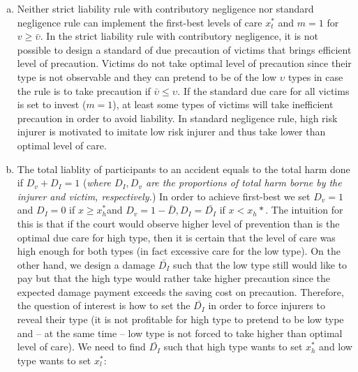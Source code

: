 \documentclass[12pt,english]{article}%
\begin{document}
\begin{enumerate}[(a)]
		\item Neither strict liability rule with contributory negligence nor standard negligence rule can implement the first-best levels of care $x_t^*$ and $m=1$ for $v\geq\bar{\upsilon}$. In the strict liability rule with contributory negligence, it is not possible to design a standard of due precaution of victims that brings efficient level of precaution. Victims do not take optimal level of precaution since their type is not observable and they can pretend to be of the low $\upsilon$ types in case the rule is to take precaution if $\bar{\upsilon}\leq\upsilon$. If the standard due care for all victims is set to invest ($m=1$), at least some types of victims will take inefficient precaution in order to avoid liability. In standard negligence rule, high risk injurer is motivated to imitate low risk injurer and thus take lower than optimal level of care. 
		\item The total liablity of participants to an accident equals to the total harm done if $D_v+D_I=1$ (\textit{where $D_I,D_v$ are the proportions of total harm borne by the injurer and victim, respectively.})	In order to achieve first-best we set $D_v=1$ and $D_I=0$ if $x\geq{x_h^*}$and $D_v=1-\bar{D},D_I=\bar{D_I}$ if $x<{x_h*}$. The intuition for this is that if the court would observe higher level of prevention than is the optimal due care for high type, then it is certain that the level of care was high enough for both types (in fact excessive care for the low type). On the other hand, we design a damage $\bar{D_I}$ such that the low type still would like to pay but that the high type would rather take higher precaution since the expected damage payment exceeds the saving cost on precaution. Therefore, the question of interest is how to set the $\bar{D_I}$ in order to force injurers to reveal their type (it is not profitable for high type to pretend to be low type and -- at the same time -- low type is not forced to take higher than optimal level of care). We need to find $\bar{D_I}$ such that high type wants to set $x_h^*$  and low type wants to set $x_l^*$:
		

\end{enumerate}
\end{document}
